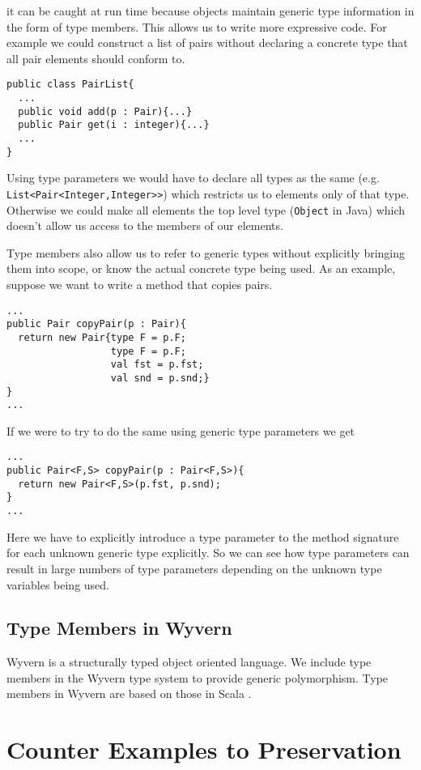 \documentclass{llncs}
\begin{document}
it can be caught at run time because objects maintain 
generic type information in the form of type members.
This allows us to write more expressive code. For example 
we could construct a list of pairs without declaring 
a concrete type that all pair elements should conform to.
\begin{lstlisting}[mathescape, style=custom_lang]
public class PairList{
  ...
  public void add(p : Pair){...}
  public Pair get(i : integer){...}
  ...
}
\end{lstlisting}
Using type parameters we would have to declare all 
types as the same (e.g. \texttt{List<Pair<Integer,Integer>>}) 
which restricts us to elements only of that type. Otherwise 
we could make all elements the top level type (\texttt{Object} 
in Java) which doesn't allow us access to the members 
of our elements.

Type members also allow us to refer to generic types without explicitly 
bringing them into scope, or know the actual concrete type 
being used. As an example, suppose we want to write a method that copies  
pairs.
\begin{lstlisting}[mathescape, style=custom_lang]
...
public Pair copyPair(p : Pair){
  return new Pair{type F = p.F; 
                  type F = p.F;
                  val fst = p.fst; 
                  val snd = p.snd;}
}
...
\end{lstlisting}
If we were to try to do the same using generic type parameters
we get
\begin{lstlisting}[mathescape, style=custom_lang]
...
public Pair<F,S> copyPair(p : Pair<F,S>){
  return new Pair<F,S>(p.fst, p.snd);
}
...
\end{lstlisting}
Here we have to explicitly introduce a type parameter to the 
method signature for each unknown generic type explicitly.
So we can see how type parameters can result in large 
numbers of type parameters  \cite{odersky:2009} %
depending on the unknown type variables being used.

\subsection{Type Members in Wyvern}
Wyvern is a structurally typed object oriented language. We 
include type members in the Wyvern type system to provide 
generic polymorphism. Type members in Wyvern are based on 
those in Scala \cite{Amin:2012}\cite{Amin:2014}.

\section{Counter Examples to Preservation}
	\label{s:examples}
\end{document}
